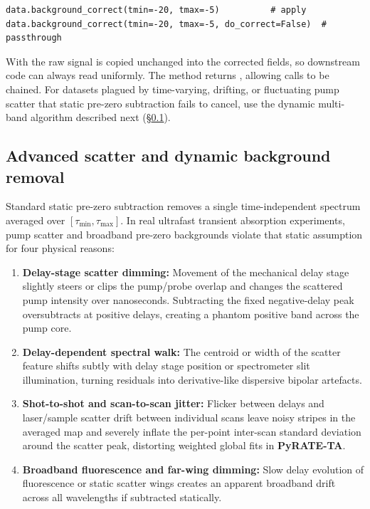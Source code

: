 \begin{lstlisting}
data.background_correct(tmin=-20, tmax=-5)          # apply
data.background_correct(tmin=-20, tmax=-5, do_correct=False)  # passthrough
\end{lstlisting}

With  the raw signal is copied unchanged into the
corrected fields, so downstream code can always read  uniformly. The
method returns , allowing calls to be chained. For datasets plagued
by time-varying, drifting, or fluctuating pump scatter that static pre-zero
subtraction fails to cancel, use the dynamic multi-band algorithm described
next (\S\ref{sec:scatter}).

\subsection{Advanced scatter and dynamic background removal}\label{sec:scatter}
Standard static pre-zero subtraction removes a single time-independent
spectrum averaged over $[\tau_{\mathrm{min}}, \tau_{\mathrm{max}}]$. In
real ultrafast transient absorption experiments, pump scatter and broadband
pre-zero backgrounds violate that static assumption for four physical reasons:
\begin{enumerate}
  \item \textbf{Delay-stage scatter dimming:} Movement of the mechanical
        delay stage slightly steers or clips the pump/probe overlap and changes
        the scattered pump intensity over nanoseconds. Subtracting the fixed
        negative-delay peak oversubtracts at positive delays, creating a
        phantom positive band across the pump core.
  \item \textbf{Delay-dependent spectral walk:} The centroid or width of the
        scatter feature shifts subtly with delay stage position or spectrometer
        slit illumination, turning residuals into derivative-like dispersive
        bipolar artefacts.
  \item \textbf{Shot-to-shot and scan-to-scan jitter:} Flicker between delays
        and laser/sample scatter drift between individual scans leave noisy
        stripes in the averaged map and severely inflate the per-point inter-scan
        standard deviation  around the scatter peak, distorting
        weighted global fits in \textbf{PyRATE-TA}.
  \item \textbf{Broadband fluorescence and far-wing dimming:} Slow delay
        evolution of fluorescence or static scatter wings creates an apparent
        broadband drift across all wavelengths if subtracted statically.
\end{enumerate}

